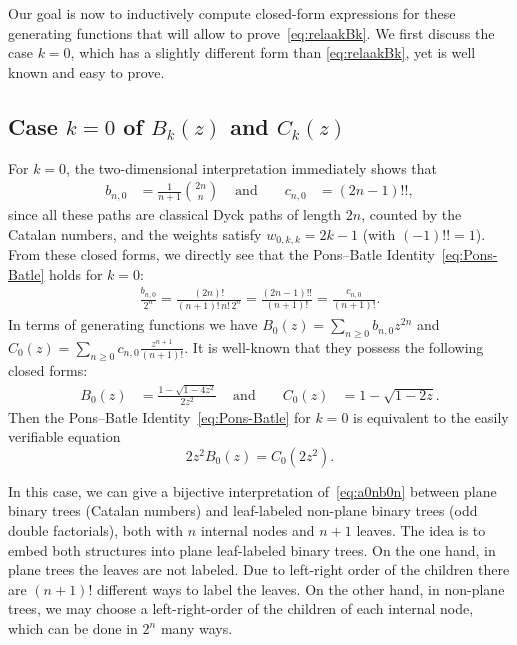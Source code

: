 \documentclass[a4paper,UKenglish,cleveref, autoref, thm-restate]{lipics-v2021}
\begin{document}
Our goal is now to inductively compute closed-form expressions for these generating functions that will allow to prove~\eqref{eq:relaakBk}.
We first discuss the case $k=0$, which has a slightly different form than \eqref{eq:relaakBk}, yet is well known and easy to prove.

\subsection{Case \texorpdfstring{$k=0$}{k=0} of \texorpdfstring{$B_k(z)$}{Bk(z)} and \texorpdfstring{$C_k(z)$}{Ck(z)}}
For $k=0$, the two-dimensional interpretation immediately shows that
\begin{align*}
b_{n,0}&=\frac{1}{n+1}\binom{2n}{n} &
\text{ and } &&
c_{n,0}&=(2n-1)!!,
\end{align*}
since all these paths are classical Dyck paths of length $2n$, counted by the Catalan numbers, and the weights satisfy $w_{0,k,k} = 2k-1$ (with $(-1)!!=1$).
From these closed forms, we directly see that the Pons--Batle Identity~\eqref{eq:Pons-Batle} holds for $k=0$:
\begin{align}
    \label{eq:a0nb0n}
\frac{b_{n,0}}{2^{n}}
= \frac{(2n)!}{(n+1)!\,n!\,2^{n}}
= \frac{(2n-1)!!}{(n+1)!}
= \frac{c_{n,0}}{(n+1)!}.
\end{align}
In terms of generating functions we have
$B_0(z)=\sum_{n\ge 0} b_{n,0} z^{2n}$ 
and
$C_0(z)=\sum_{n\ge 0} c_{n,0}\frac{z^{n+1}}{(n+1)!}.$
It is well-known that they possess the following closed forms:
\begin{align*}
B_0(z) &= \frac{1-\sqrt{1-4z^2}}{2z^2}&
\text{ and } &&
C_0(z) &= 1-\sqrt{1-2z}.
\end{align*}
Then the Pons--Batle Identity~\eqref{eq:Pons-Batle} for $k=0$ is equivalent to the easily verifiable equation
\[
2z^2B_0(z)=C_0(2z^2).
\]

\begin{remark}\label{rem:bijectioncase0}
In this case, we can give a bijective interpretation of~\eqref{eq:a0nb0n} between plane binary trees (Catalan numbers) and leaf-labeled non-plane binary trees (odd double factorials), both with $n$ internal nodes and $n+1$ leaves.
The idea is to embed both structures into plane leaf-labeled binary trees. 
On the one hand, in plane trees the leaves are not labeled. Due to left-right order of the children there are $(n+1)!$ different ways to label the leaves.
On the other hand, in non-plane trees, we may choose a left-right-order of the children of each internal node, which can be done in $2^n$ many ways.
\end{remark}
\end{document}
